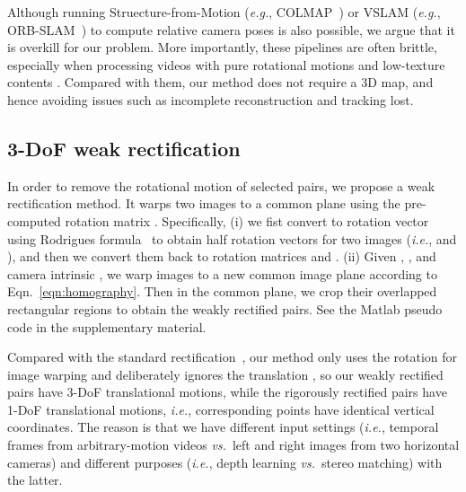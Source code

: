 \documentclass{article}
\newcommand{\equref}[1]{Eqn.~\ref{#1}}
\def\eg{\emph{e.g.}}
\def\ie{\emph{i.e.}}
\def\vs{\emph{vs.}}
\begin{document}
Although running Struecture-from-Motion (\eg, COLMAP~\cite{schonberger2016structure}) or VSLAM (\eg, ORB-SLAM~\cite{mur2015orb}) to compute relative camera poses is also possible,
we argue that it is overkill for our problem.
More importantly, these pipelines are often brittle, especially when processing videos with pure rotational motions and low-texture contents \cite{parra2019visual}.
Compared with them, our method does not require a 3D map,
and hence avoiding issues such as incomplete reconstruction and tracking lost.


\subsection{3-DoF weak rectification}\label{sec:rectify}

In order to remove the rotational motion of selected pairs,
we propose a weak rectification method.
It warps two images to a common plane using the pre-computed rotation matrix .
Specifically, (i) we fist convert  to rotation vector  using Rodrigues formula~\cite{trucco1998introductory} to obtain half rotation vectors for two images (\ie,  and ),
and then we convert them back to rotation matrices  and .
(ii) Given , , and camera intrinsic , we warp images to a new common image plane according to \equref{eqn:homography}.
Then in the common plane, we crop their overlapped rectangular regions to obtain the weakly rectified pairs.
See the Matlab pseudo code in the supplementary material.

Compared with the standard rectification~\cite{fusiello2000compact},
our method only uses the rotation  for image warping and deliberately ignores the translation ,
so our weakly rectified pairs have 3-DoF translational motions,
while the rigorously rectified pairs have 1-DoF translational motions, \ie, corresponding points have identical vertical coordinates.
The reason is that we have different input settings (\ie, temporal frames from arbitrary-motion videos \vs\ left and right images from two horizontal cameras)
and different purposes (\ie, depth learning \vs\ stereo matching) with the latter.
\end{document}
